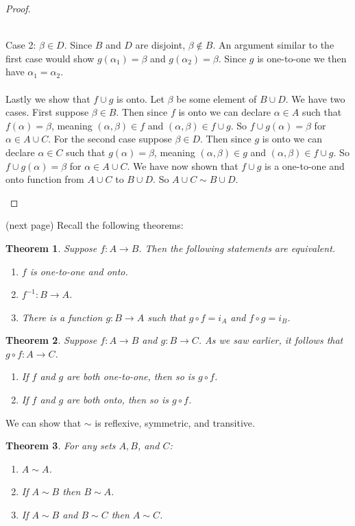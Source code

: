 \documentclass{report}
\newtheorem*{theorem}{Theorem}
\theoremstyle{definition}
\begin{document}
\begin{proof}
\begin{enumerate}
\vspace{1mm}\\
Case 2: $\beta\in D$. Since $B$ and $D$ are disjoint, $\beta\notin B$. An argument similar to the first case would show 
$g(\alpha_1)=\beta$ and $g(\alpha_2)=\beta$. Since $g$ is one-to-one we then have $\alpha_1=\alpha_2$.\\
\vspace{1mm}\\
Lastly we show that $f\cup g$ is onto. Let $\beta$ be some element of $B\cup D$. We have two cases. First suppose $\beta\in B$. Then 
since $f$ is onto we can declare $\alpha\in A$ such that $f(\alpha)=\beta$, meaning $(\alpha,\beta)\in f$ and 
$(\alpha,\beta)\in f\cup g$. So $f\cup g(\alpha)=\beta$ for $\alpha\in A\cup C$. 
For the second case suppose $\beta\in D$. Then since $g$ is onto we can declare $\alpha\in C$ such that $g(\alpha)=\beta$, meaning $(\alpha,\beta)\in g$ and 
$(\alpha,\beta)\in f\cup g$. So $f\cup g(\alpha)=\beta$ for $\alpha\in A\cup C$.
We have now shown that $f\cup g$ is a one-to-one and onto function from $A\cup C$ to $B\cup D$.
So $A\cup C\sim B\cup D$.\qedhere
\end{enumerate}
\end{proof}
\noindent(next page)\newpage
\noindent Recall the following theorems:
\begin{theorem}
Suppose $f:A\to B$. Then the following statements are equivalent.
\begin{enumerate}
\item $f$ is one-to-one and onto.
\item $f^{-1}:B\to A$.
\item There is a function $g:B\to A$ such that $g\circ f=i_A$ and $f\circ g=i_B$.
\end{enumerate}
\end{theorem}
\begin{theorem}
Suppose $f:A\to B$ and $g:B\to C$. As we saw earlier, it follows that $g\circ f:A\to C$. 
\begin{enumerate}
\item If $f$ and $g$ are both one-to-one, then so is $g\circ f$.
\item If $f$ and $g$ are both onto, then so is $g\circ f$.
\end{enumerate}
\end{theorem}
\noindent We can show that $\sim$ is reflexive, symmetric, and transitive. 
\begin{theorem}
For any sets $A,B$, and $C$:
\begin{enumerate}
\item $A\sim A$.
\item If $A\sim B$ then $B\sim A$.
\item If $A\sim B$ and $B\sim C$ then $A\sim C$.
\end{enumerate}
\end{theorem}
\end{document}
